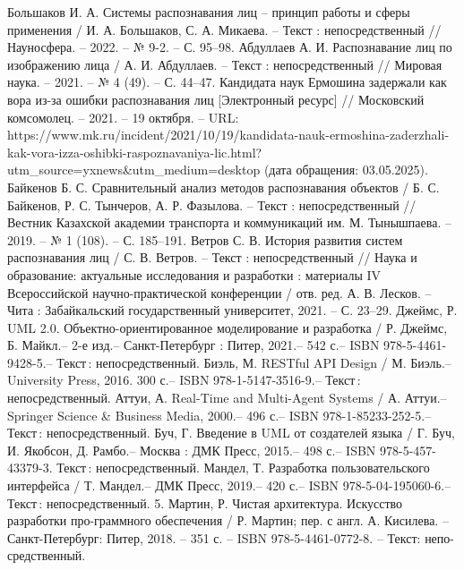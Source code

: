 
\begin{thebibliography}{9}
     Большаков И. А. Системы распознавания лиц – принцип работы и сферы применения / И. А. Большаков, С. А. Микаева. – Текст : непосредственный // Науносфера. – 2022. – № 9-2. – С. 95–98.
     Абдуллаев А. И. Распознавание лиц по изображению лица / А. И. Абдуллаев. – Текст : непосредственный // Мировая наука. – 2021. – № 4 (49). – С. 44–47.
     Кандидата наук Ермошина задержали как вора из-за ошибки распознавания лиц [Электронный ресурс] // Московский комсомолец. – 2021. – 19 октября. – URL: https://www.mk.ru/incident/2021/10/19/kandidata-nauk-ermoshina-zaderzhali-kak-vora-izza-oshibki-raspoznavaniya-lic.html? utm\_source=yxnews\&utm\_medium=desktop (дата обращения: 03.05.2025).
      Байкенов Б. С. Сравнительный анализ методов распознавания объектов / Б. С. Байкенов, Р. С. Тынчеров, А. Р. Фазылова. – Текст : непосредственный // Вестник Казахской академии транспорта и коммуникаций им. М. Тынышпаева. – 2019. – № 1 (108). – С. 185–191.
      Ветров С. В. История развития систем распознавания лиц / С. В. Ветров. – Текст : непосредственный // Наука и образование: актуальные исследования и разработки : материалы IV Всероссийской научно-практической конференции / отв. ред. А. В. Лесков. – Чита : Забайкальский государственный университет, 2021. – С. 23–29.
      Джеймс, Р. UML 2.0. Объектно-ориентированное моделирование и
     разработка / Р. Джеймс, Б. Майкл.– 2-е изд.– Санкт-Петербург : Питер, 2021.– 542 с.– ISBN 978-5-4461-9428-5.– Текст : непосредственный. 
      Биэль, М. RESTful API Design / М. Биэль.– University Press, 2016.
     300 с.– ISBN 978-1-5147-3516-9.– Текст : непосредственный.
      Аттуи, А. Real-Time and Multi-Agent Systems / А. Аттуи.– Springer
     Science \& Business Media, 2000.– 496 с.– ISBN 978-1-85233-252-5.– Текст :
     непосредственный.
      Буч, Г. Введение в UML от создателей языка / Г. Буч, И. Якобсон,
     Д. Рамбо.– Москва : ДМК Пресс, 2015.– 498 с.– ISBN 978-5-457-43379-3.
     Текст : непосредственный.
      Мандел, Т. Разработка пользовательского интерфейса / Т. Мандел.– ДМК Пресс, 2019.– 420 с.– ISBN 978-5-04-195060-6.– Текст : непосредственный.
      5.	Мартин, Р. Чистая архитектура. Искусство разработки про-граммного обеспечения / Р. Мартин; пер. с англ. А. Кисилева. – Санкт-Петербург: Питер, 2018. – 351 с. – ISBN 978-5-4461-0772-8. – Текст: непо-средственный.
\end{thebibliography}
